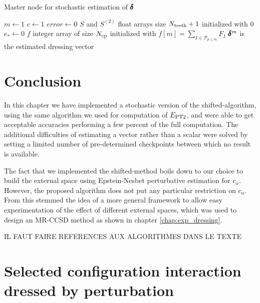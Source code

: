 \documentclass[./thesis.tex]{subfiles}
\begin{document}
\begin{algorithm}
        \caption{Master node for stochastic estimation of ${\pmb \delta}$ }
	$m \gets 1$ \;
	$c \gets 1$ \;
	$error \gets 0$ \;
	$S$ and $S^{(2)}$ float arrays size $N_\text{teeth}+1$ initialized with $0$ \;
	$e_* \gets 0$ \;
	$\dot f$ integer array of size ${N_\text{cp}}$ initialized with $\dot f[m] = \sum_{I \in \mathcal{P}_{p\leq m}} F_{I}$ \;
	$\pmb \delta^m$ is the estimated dressing vector \;
	
\end{algorithm}


\section{Conclusion}

In this chapter we have implemented a stochastic version of the shifted-\Bk algorithm, using the same algorithm we used for computation of $E_\text{PT2}$, and were able to get acceptable accuracies performing a few percent of the full computation.
The additional difficulties of estimating a vector rather than a scalar were solved by setting a limited number of pre-determined checkpoints between which no result is available.

The fact that we implemented the shifted-\Bk method boils down to our choice to build the external space using Epstein-Nesbet perturbative estimation for $c_\alpha$. However, the proposed algorithm does not put any particular restriction on $c_\alpha$. From this stemmed the idea of a more general framework to allow easy experimentation of the effect of different external spaces, which was used to design an MR-CCSD method as shown in chapter \ref{chap:exp_dressing}.

\alert{IL FAUT FAIRE REFERENCES AUX ALGORITHMES DANS LE TEXTE}


\clearpage
\section{Selected configuration interaction dressed by perturbation}
\label{sec:matrix_article}



\end{document}
